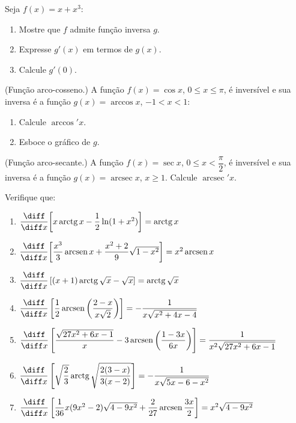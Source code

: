 \begin{exercicio}[5]
Seja $f(x) = x + x^3$:
\begin{enumerate}[label=\alph*)]
    \item Mostre que $f$ admite função inversa $g$.
    \item Expresse $g'(x)$ em termos de $g(x)$.
    \item Calcule $g'(0)$.
\end{enumerate}
\end{exercicio}

\begin{exercicio}[6]
(Função arco-cosseno.) A função $f(x) = \cos x$, $0 \le x \le \pi$, é inversível e sua inversa é a função $g(x) = \arccos x$, $-1 < x < 1$:
\begin{enumerate}[label=\alph*)]
    \item Calcule $\arccos' x$.
    \item Esboce o gráfico de $g$.
\end{enumerate}
\end{exercicio}

\begin{exercicio}[7]
(Função arco-secante.) A função $f(x) = \sec x$, $0 \le x < \dfrac{\pi}{2}$, é inversível e sua inversa é a função $g(x) = \operatorname{arcsec} x$, $x \ge 1$. Calcule $\operatorname{arcsec}' x$.
\end{exercicio}

\begin{exercicio}[8]
Verifique que:
\begin{enumerate}[label=\alph*)]
    \item $\dfrac{\diff}{\diff x}\!\left[x\operatorname{arctg} x - \dfrac{1}{2}\ln(1 + x^2)\right] = \operatorname{arctg} x$
    \item $\dfrac{\diff}{\diff x}\!\left[\dfrac{x^3}{3}\operatorname{arcsen} x + \dfrac{x^2 + 2}{9}\sqrt{1 - x^2}\right] = x^2 \operatorname{arcsen} x$
    \item $\dfrac{\diff}{\diff x}\left[(x + 1)\operatorname{arctg}\sqrt{x} - \sqrt{x}\right] = \operatorname{arctg}\sqrt{x}$
    \item $\dfrac{\diff}{\diff x}\left[\dfrac{1}{2}\operatorname{arcsen}\left(\dfrac{2 - x}{x\sqrt{2}}\right)\right] = -\dfrac{1}{x\sqrt{x^2 + 4x - 4}}$
    \item $\dfrac{\diff}{\diff x}\left[\dfrac{\sqrt{27x^2 + 6x - 1}}{x} - 3\operatorname{arcsen}\left(\dfrac{1 - 3x}{6x}\right)\right] = \dfrac{1}{x^2 \sqrt{27x^2 + 6x - 1}}$
    \item $\dfrac{\diff}{\diff x}\left[\sqrt{\dfrac{2}{3}}\operatorname{arctg}\sqrt{\dfrac{2(3 - x)}{3(x - 2)}}\right] = -\dfrac{1}{x\sqrt{5x - 6 - x^2}}$
    \item $\dfrac{\diff}{\diff x}\left[\dfrac{1}{36}x(9x^2 - 2)\sqrt{4 - 9x^2} + \dfrac{2}{27}\operatorname{arcsen}\dfrac{3x}{2}\right] = x^2 \sqrt{4 - 9x^2}$
\end{enumerate}
\end{exercicio}
